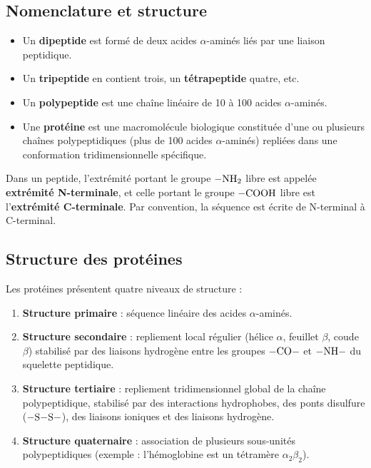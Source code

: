\subsection{Nomenclature et structure}

\begin{definition}
\begin{itemize}
    \item Un \textbf{dipeptide} est formé de deux acides $\alpha$-aminés liés par une liaison peptidique.
    \item Un \textbf{tripeptide} en contient trois, un \textbf{tétrapeptide} quatre, etc.
    \item Un \textbf{polypeptide} est une chaîne linéaire de 10 à 100 acides $\alpha$-aminés.
    \item Une \textbf{protéine} est une macromolécule biologique constituée d'une ou plusieurs chaînes polypeptidiques (plus de 100 acides $\alpha$-aminés) repliées dans une conformation tridimensionnelle spécifique.
\end{itemize}
\end{definition}

\begin{remarque}
Dans un peptide, l'extrémité portant le groupe $\ce{-NH2}$ libre est appelée \textbf{extrémité N-terminale}, et celle portant le groupe $\ce{-COOH}$ libre est l'\textbf{extrémité C-terminale}. Par convention, la séquence est écrite de N-terminal à C-terminal.
\end{remarque}

\subsection{Structure des protéines}

\begin{propriete}
Les protéines présentent quatre niveaux de structure :
\begin{enumerate}
    \item \textbf{Structure primaire} : séquence linéaire des acides $\alpha$-aminés.
    \item \textbf{Structure secondaire} : repliement local régulier (hélice $\alpha$, feuillet $\beta$, coude $\beta$) stabilisé par des liaisons hydrogène entre les groupes $\ce{-CO-}$ et $\ce{-NH-}$ du squelette peptidique.
    \item \textbf{Structure tertiaire} : repliement tridimensionnel global de la chaîne polypeptidique, stabilisé par des interactions hydrophobes, des ponts disulfure ($\ce{-S-S-}$), des liaisons ioniques et des liaisons hydrogène.
    \item \textbf{Structure quaternaire} : association de plusieurs sous-unités polypeptidiques (exemple : l'hémoglobine est un tétramère $\alpha_2\beta_2$).
\end{enumerate}
\end{propriete}

